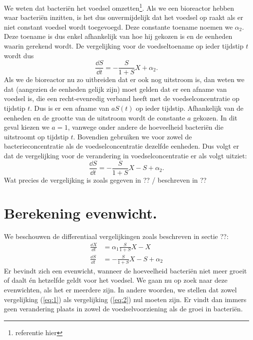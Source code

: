 We weten dat bacteri\"en het voedsel omzetten\footnote{referentie hier}. Als we een bioreactor hebben waar bacteri\"en inzitten, is het dus onvermijdelijk dat het voedsel op raakt als er niet constant voedsel wordt toegevoegd. Deze constante toename noemen we $\alpha_2$. Deze toename is dus enkel afhankelijk van hoe hij gekozen is en de eenheden waarin gerekend wordt. De vergelijking voor de voedseltoename op ieder tijdstip $t$ wordt dus
\begin{equation*}
	\frac{\dd S}{\dd t} = -\frac{S}{1 + S} X + \alpha_2.
\end{equation*}
Als we de bioreactor nu zo uitbreiden dat er ook nog uitstroom is, dan weten we dat (aangezien de eenheden gelijk zijn) moet gelden dat er een afname van voedsel is, die een recht-evenredig verband heeft met de voedselconcentratie op tijdstip $t$. Dus is er een afname van $a S(t)$ op ieder tijdstip. Afhankelijk van de eenheden en de grootte van de uitstroom wordt de constante $a$ gekozen. In dit geval kiezen we $a = 1$, vanwege onder andere de hoeveelheid bacteri\"en die uitstroomt op tijdstip $t$. Bovendien gebruiken we voor zowel de bacterieconcentratie als de voedselconcentratie dezelfde eenheden. Dus volgt er dat de vergelijking voor de verandering in voedselconcentratie er als volgt uitziet:
\begin{equation}
	\frac{\dd S}{\dd t} = -\frac{S}{1 + S} X - S + \alpha_2.
\end{equation}
Wat precies de vergelijking is zoals gegeven in ?? / beschreven in ??

\section{Berekening evenwicht.}
We beschouwen de differentiaal vergelijkingen zoals beschreven in sectie ??: %
\begin{align}
	\frac{\dd X}{\dd t} &= \alpha_1 \frac{S}{1 + S} X - X 			\label{eq:1}	\\
	\frac{\dd S}{\dd t} &= - \frac{S}{1 + S}X - S + \alpha_2 		\label{eq:2}
\end{align}
Er bevindt zich een evenwicht, wanneer de hoeveelheid bacteri\"en niet meer groeit of daalt \'en hetzelfde geldt voor het voedsel. We gaan nu op zoek naar deze evenwichten, als het er meerdere zijn. In andere woorden, we stellen dat zowel vergelijking (\ref{eq:1}) als vergelijking (\ref{eq:2}) nul moeten zijn. Er vindt dan immers geen verandering plaats in zowel de voedselvoorziening als de groei in bacteri\"en. 

